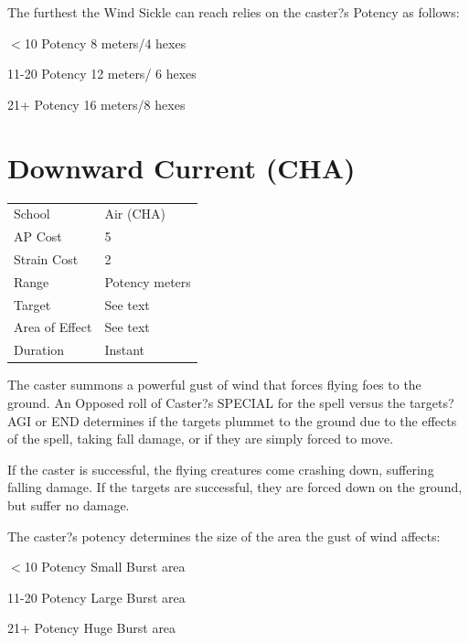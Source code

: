 \documentclass[11pt,a4paper,twocolumn]{book}
\begin{document}
	The furthest the Wind Sickle can reach relies on the caster?s Potency as follows:
	
	\begin{compactitem}
		\item $<$10 Potency 		8 meters/4 hexes
		\item 11-20 Potency 		12 meters/ 6 hexes
		\item 21+ Potency 			16 meters/8 hexes
	\end{compactitem}
	
									\section*{Downward Current (CHA)}
	{
		\begin{tabu} to 75mm{| X[l,4] | X[l,7] |}
			\hline
			School 			&  Air (CHA)			\\
			AP Cost	      	&  5					\\
			Strain Cost     &  2					\\
			Range     		&  Potency meters		\\
			Target      	&  See text				\\
			Area of Effect  &  See text	 			\\
			Duration     	&  Instant				\\ \hline
		\end{tabu}
		
	}
	
	\medskip
	
	The caster summons a powerful gust of wind that forces flying foes to the ground. An Opposed roll of Caster?s SPECIAL for the spell versus the targets? AGI or END determines if the targets plummet to the ground due to the effects of the spell, taking fall damage, or if they are simply forced to move. 
	
	If the caster is successful, the flying creatures come crashing down, suffering falling damage. If the targets are successful, they are forced down on the ground, but suffer no damage.
	
	The caster?s potency determines the size of the area the gust of wind affects:
	
	\begin{compactitem}
		\item $<$10 Potency 		Small Burst area
		\item 11-20 Potency 		Large Burst area
		\item 21+ Potency 			Huge Burst area
	\end{compactitem}
	
\end{document}
